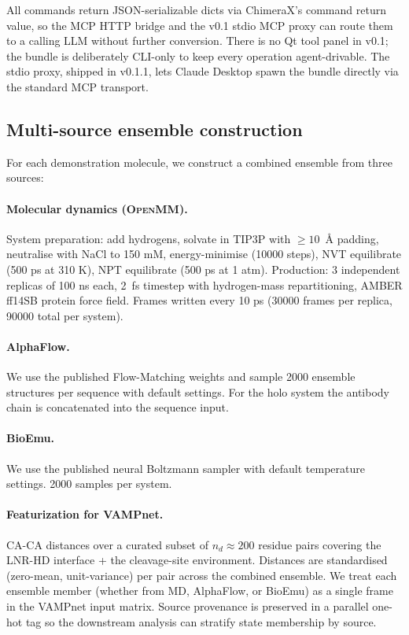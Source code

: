 \documentclass[11pt]{article}
\begin{document}
All commands return JSON-serializable dicts via ChimeraX's command
return value, so the MCP HTTP bridge and the v0.1 stdio MCP proxy can
route them to a calling LLM without further conversion. There is no Qt
tool panel in v0.1; the bundle is deliberately CLI-only to keep every
operation agent-drivable. The stdio proxy, shipped in v0.1.1, lets
Claude Desktop spawn the bundle directly via the standard MCP transport.

\subsection{Multi-source ensemble construction}

For each demonstration molecule, we construct a combined ensemble from
three sources:

\paragraph{Molecular dynamics (\textsc{OpenMM}).} System preparation:
add hydrogens, solvate in TIP3P with $\geq 10$~\AA{} padding, neutralise
with NaCl to 150 mM, energy-minimise (10000 steps), NVT equilibrate
(500 ps at 310 K), NPT equilibrate (500 ps at 1 atm). Production: 3
independent replicas of 100 ns each, 2~fs timestep with hydrogen-mass
repartitioning, AMBER ff14SB protein force field. Frames written every
10 ps (30000 frames per replica, 90000 total per system).

\paragraph{AlphaFlow.} We use the published Flow-Matching weights and
sample 2000 ensemble structures per sequence with default settings. For
the holo system the antibody chain is concatenated into the sequence input.

\paragraph{BioEmu.} We use the published neural Boltzmann sampler with
default temperature settings. 2000 samples per system.

\paragraph{Featurization for VAMPnet.} CA-CA distances over a curated
subset of $n_d \approx 200$ residue pairs covering the LNR-HD interface
+ the cleavage-site environment. Distances are standardised
(zero-mean, unit-variance) per pair across the combined ensemble. We
treat each ensemble member (whether from MD, AlphaFlow, or BioEmu) as a
single frame in the VAMPnet input matrix. Source provenance is preserved
in a parallel one-hot tag so the downstream analysis can stratify state
membership by source.
\end{document}

